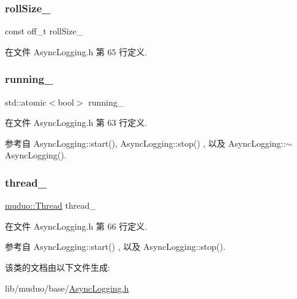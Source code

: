 \subsubsection{\texorpdfstring{roll\+Size\+\_\+}{rollSize\_}}
{\footnotesize\ttfamily const off\+\_\+t roll\+Size\+\_\+\hspace{0.3cm}{\ttfamily [private]}}



在文件 Async\+Logging.\+h 第 65 行定义.

\mbox{\label{classmuduo_1_1AsyncLogging_aa9620a15c76ada2388bf678e373a6463}} 
\subsubsection{\texorpdfstring{running\+\_\+}{running\_}}
{\footnotesize\ttfamily std\+::atomic$<$bool$>$ running\+\_\+\hspace{0.3cm}{\ttfamily [private]}}



在文件 Async\+Logging.\+h 第 63 行定义.



参考自 Async\+Logging\+::start(), Async\+Logging\+::stop() , 以及 Async\+Logging\+::$\sim$\+Async\+Logging().

\mbox{\label{classmuduo_1_1AsyncLogging_aa0093f2535e4d8943878c3a5b626f730}} 
\subsubsection{\texorpdfstring{thread\+\_\+}{thread\_}}
{\footnotesize\ttfamily \hyperlink{classmuduo_1_1Thread}{muduo\+::\+Thread} thread\+\_\+\hspace{0.3cm}{\ttfamily [private]}}



在文件 Async\+Logging.\+h 第 66 行定义.



参考自 Async\+Logging\+::start() , 以及 Async\+Logging\+::stop().



该类的文档由以下文件生成\+:\begin{DoxyCompactItemize}
\item 
lib/muduo/base/\hyperlink{AsyncLogging_8h}{Async\+Logging.\+h}\end{DoxyCompactItemize}
